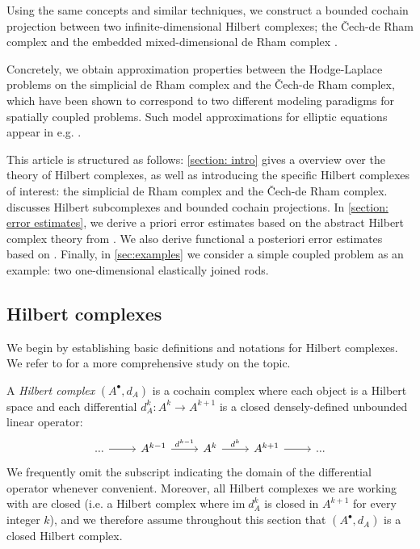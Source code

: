 \documentclass[reqno]{amsart}
\numberwithin{equation}{section}
\theoremstyle{definition}
\begin{document}
Using the same concepts and similar techniques, we construct a bounded cochain projection between two infinite-dimensional Hilbert complexes; the \v{C}ech-de Rham complex \cite{bott-tu, cdrhodge} and the embedded mixed-dimensional de Rham complex \cite{mdG, holmen2024injective}. 

Concretely, we obtain approximation properties between the Hodge-Laplace problems on the simplicial de Rham complex and the \v{C}ech-de Rham complex, which have been shown to correspond to two different modeling paradigms for spatially coupled problems. Such model approximations for elliptic equations appear in e.g. \cite{koppl2018mathematical, list2020rigorous}.

This article is structured as follows: \cref{section: intro} gives a overview over the theory of Hilbert complexes, as well as introducing the specific Hilbert complexes of interest: the simplicial de Rham complex and the \v{C}ech-de Rham complex.  discusses Hilbert subcomplexes and bounded cochain projections. In \cref{section: error estimates}, we derive a priori error estimates based on the abstract Hilbert complex theory from \cite{arnoldFEEC3}. We also derive functional a posteriori error estimates based on \cite{pauly2020solution}. Finally, in \cref{sec:examples} we consider a simple coupled problem as an example: two one-dimensional elastically joined rods.

\subsection{Hilbert complexes}\label{subsection: HC}
We begin by establishing basic definitions and notations for Hilbert complexes. We refer to \cite{arnoldFEEC3, arnoldFEEC2} for a more comprehensive study on the topic. 

A \emph{Hilbert complex} $(A^\bullet, d_A)$ is a cochain complex where each object is a Hilbert space and each differential $d_A^k: A^k \to A^{k+1}$ is a closed densely-defined unbounded linear operator:
\begin{equation}
\begin{tikzcd}
	{...} & {A^{k-1}} & {A^{k}} & {A^{k+1}} & {...}
	\arrow[from=1-1, to=1-2]
	\arrow["{d^{k-1}}", from=1-2, to=1-3]
	\arrow["{d^{k}}", from=1-3, to=1-4]
	\arrow[from=1-4, to=1-5]
\end{tikzcd}   
\end{equation}
We frequently omit the subscript indicating the domain of the differential operator whenever convenient. Moreover, all Hilbert complexes we are working with are closed (i.e. a Hilbert complex where $\mathrm{im} \; d_A^k$ is closed in $A^{k+1}$ for every integer $k$), and we therefore assume throughout this section that  $(A^\bullet, d_A)$ is a closed Hilbert complex.
\end{document}
